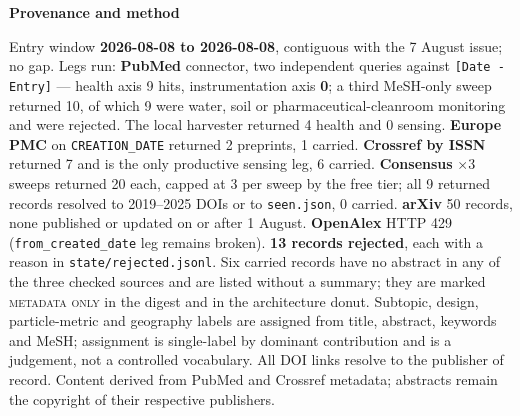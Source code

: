 \documentclass[10pt]{article}
\begin{document}
\vspace{4mm}
\begin{keybox}
{\sffamily\bfseries\footnotesize\color{Deep}Provenance and method}\\[1.2mm]
{\fontsize{7.2}{8.8}\selectfont
Entry window \textbf{2026-08-08 to 2026-08-08}, contiguous with the 7 August issue; no
gap. Legs run: \textbf{PubMed} connector, two independent queries against
\texttt{[Date - Entry]} --- health axis 9 hits, instrumentation axis \textbf{0}; a third
MeSH-only sweep returned 10, of which 9 were water, soil or pharmaceutical-cleanroom
monitoring and were rejected. The local harvester returned 4 health and 0 sensing.
\textbf{Europe PMC} on \texttt{CREATION\_DATE} returned 2 preprints, 1 carried.
\textbf{Crossref by ISSN} returned 7 and is the only productive sensing leg, 6 carried.
\textbf{Consensus} $\times$3 sweeps returned 20 each, capped at 3 per sweep by the free
tier; all 9 returned records resolved to 2019--2025 DOIs or to \texttt{seen.json}, 0
carried. \textbf{arXiv} 50 records, none published or updated on or after 1 August.
\textbf{OpenAlex} HTTP 429 (\texttt{from\_created\_date} leg remains broken).
\textbf{13 records rejected}, each with a reason in \texttt{state/rejected.jsonl}.
Six carried records have no abstract in any of the three checked sources and are
listed without a summary; they are marked \textsc{metadata only} in the digest and in
the architecture donut.
Subtopic, design, particle-metric and geography labels are assigned from title, abstract,
keywords and MeSH; assignment is single-label by dominant contribution and is a
judgement, not a controlled vocabulary.
All DOI links resolve to the publisher of record. Content derived from PubMed and
Crossref metadata; abstracts remain the copyright of their respective publishers.\par}
\end{keybox}
\end{document}
